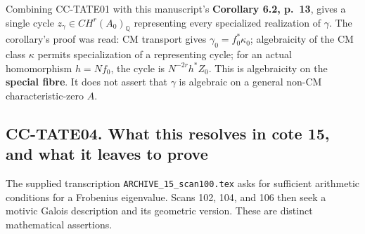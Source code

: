 Combining CC-TATE01 with this manuscript's \textbf{Corollary 6.2,
p.~13}, gives a single cycle \(z_\gamma\in CH^r(A_0)_{\mathbb Q}\)
representing every specialized realization of \(\gamma\). The
corollary's proof was read: CM transport gives
\(\gamma_0=f_0^*\kappa_0\); algebraicity of the CM class \(\kappa\)
permits specialization of a representing cycle; for an actual
homomorphism \(h=Nf_0\), the cycle is \(N^{-2r}h^*Z_0\). This is
algebraicity on the \textbf{special fibre}. It does not assert that
\(\gamma\) is algebraic on a general non-CM characteristic-zero \(A\).

\subsection{CC-TATE04. What this resolves in cote 15, and what it leaves
to
prove}\label{cc-tate04.-what-this-resolves-in-cote-15-and-what-it-leaves-to-prove}

The supplied transcription \texttt{ARCHIVE\_15\_scan100.tex} asks for
sufficient arithmetic conditions for a Frobenius eigenvalue. Scans 102,
104, and 106 then seek a motivic Galois description and its geometric
version. These are distinct mathematical assertions.

